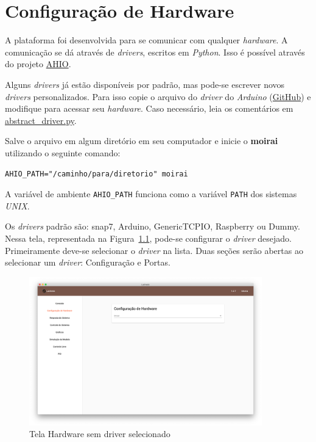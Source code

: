 
\chapter{Configuração de Hardware}%
\label{chapter:hardware-configuration}

A plataforma foi desenvolvida para se comunicar com qualquer \textit{hardware}.
A comunicação se dá através de \textit{drivers}, escritos em \textit{Python}.
Isso é possível através do projeto
\href{https://github.com/acristoffers/ahio}{AHIO}.

Alguns \textit{drivers} já estão disponíveis por padrão, mas pode-se escrever
novos \textit{drivers} personalizados. Para isso copie o arquivo do
\textit{driver} do \textit{Arduino}
(\href{https://github.com/acristoffers/ahio/blob/master/ahio/drivers/arduino.py}{GitHub})
e modifique para acessar seu \textit{hardware}. Caso necessário, leia os
comentários em
\href{https://github.com/acristoffers/ahio/blob/master/ahio/abstract_driver.py}{abstract\_driver.py}.

Salve o arquivo em algum diretório em seu computador e inicie o \textbf{moirai}
utilizando o seguinte comando:

\texttt{AHIO_PATH="/caminho/para/diretorio" moirai}

A variável de ambiente \texttt{AHIO_PATH} funciona como a variável
\texttt{PATH} dos sistemas \textit{UNIX}.

Os \textit{drivers} padrão são: snap7, Arduino, GenericTCPIO, Raspberry ou
Dummy. Nessa tela, representada na Figura~\ref{fig:hardware1}, pode-se
configurar o \textit{driver} desejado. Primeiramente deve-se selecionar o
\textit{driver} na lista. Duas seções serão abertas ao selecionar um
\textit{driver}: Configuração e Portas.

\begin{figure}[ht!]
    \centering
    \includegraphics[width=0.9\textwidth]{imgs/hardware}
    \caption[Tela Hardware sem driver selecionado]{Tela Hardware sem driver selecionado}%
    \label{fig:hardware1}
\end{figure}

